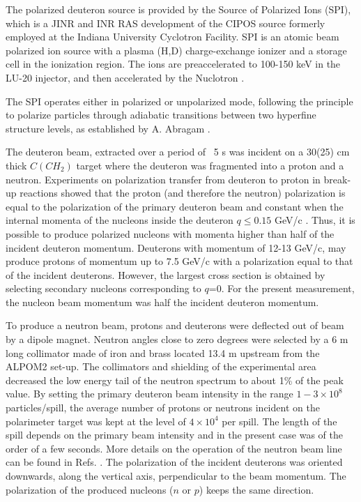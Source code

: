 \documentclass[twocolumn,epjc3]{svjour3}
\begin{document}
The polarized deuteron source is provided by the Source of Polarized Ions (SPI), which is a JINR and INR RAS development of the CIPOS source \cite{Agapov:2004uu} formerly employed at the Indiana University Cyclotron Facility. SPI is an atomic beam polarized ion source with a plasma (H,D) charge-exchange ionizer and a storage cell in the ionization region. The ions are preaccelerated to 100-150 keV in the LU-20 injector, and then accelerated by the Nuclotron \cite{Fimushkin:2016uu}.

The SPI operates either in polarized or unpolarized mode, following the principle to polarize particles through adiabatic transitions between two hyperfine structure levels, as established by A. Abragam \cite{abragam1961}.

The deuteron beam, extracted over a period of ~5 s was incident on a 30(25) cm thick $C(CH_2)$ target where the deuteron was fragmented into a proton and a neutron. Experiments on polarization transfer from deuteron to proton in break-up reactions showed that the proton (and therefore the neutron) polarization is equal to the polarization of the primary deuteron beam and constant when the internal momenta of the nucleons inside the deuteron $q\le 0.15$ GeV/c \cite{Kuehn:1995hy}. Thus, it is possible to produce polarized nucleons with momenta higher than half of the incident deuteron momentum. Deuterons with momentum of 12-13 GeV/c, may produce protons of momentum up to 7.5 GeV/c with a polarization equal to that of the incident deuterons. However, the largest cross section is obtained by selecting secondary nucleons corresponding to $q$=0. For the present measurement, the nucleon beam momentum was half the incident deuteron momentum.

To produce a neutron beam, protons and deuterons were deflected out of beam by a dipole magnet.  Neutron angles close to zero degrees were selected by a 6 m long collimator made of iron and brass located 13.4 m upstream from the ALPOM2 set-up. The collimators and shielding of the experimental area decreased the low energy tail of the neutron spectrum to about 1\% of the peak value.  By setting the primary deuteron beam intensity in the range $ {1-3\times 10^8}$ particles/spill, the average number of protons or neutrons incident on the polarimeter target was kept at the level of $4\times 10^4$ per spill. The length of the spill depends on the primary beam intensity and in the present case was of the order of a few seconds. More details on the operation of the neutron beam line can be found in Refs. \cite{Kirillov:1996zf,Rukoyatkin:2001nd}.  The polarization of the incident deuterons was oriented downwards, along the vertical axis, perpendicular to the beam momentum. The polarization of the produced nucleons ($n$ or $p$) keeps the same direction.
\end{document}

